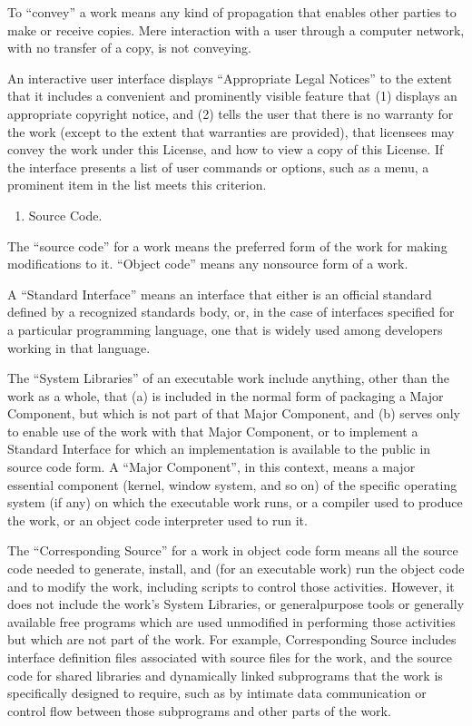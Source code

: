 \documentclass[letterpaper,10pt,english]{sphinxmanual}
\begin{document}
\sphinxAtStartPar
To “convey” a work means any kind of propagation that enables other parties to make or receive copies. Mere interaction with a user through a computer network, with no transfer of a copy, is not conveying.

\sphinxAtStartPar
An interactive user interface displays “Appropriate Legal Notices” to the extent that it includes a convenient and prominently visible feature that (1) displays an appropriate copyright notice, and (2) tells the user that there is no warranty for the work (except to the extent that warranties are provided), that licensees may convey the work under this License, and how to view a copy of this License. If the interface presents a list of user commands or options, such as a menu, a prominent item in the list meets this criterion.
\begin{enumerate}
%
\item {} 
\sphinxAtStartPar
Source Code.

\end{enumerate}

\sphinxAtStartPar
The “source code” for a work means the preferred form of the work for making modifications to it. “Object code” means any non\sphinxhyphen{}source form of a work.

\sphinxAtStartPar
A “Standard Interface” means an interface that either is an official standard defined by a recognized standards body, or, in the case of interfaces specified for a particular programming language, one that is widely used among developers working in that language.

\sphinxAtStartPar
The “System Libraries” of an executable work include anything, other than the work as a whole, that (a) is included in the normal form of packaging a Major Component, but which is not part of that Major Component, and (b) serves only to enable use of the work with that Major Component, or to implement a Standard Interface for which an implementation is available to the public in source code form. A “Major Component”, in this context, means a major essential component (kernel, window system, and so on) of the specific operating system (if any) on which the executable work runs, or a compiler used to produce the work, or an object code interpreter used to run it.

\sphinxAtStartPar
The “Corresponding Source” for a work in object code form means all the source code needed to generate, install, and (for an executable work) run the object code and to modify the work, including scripts to control those activities. However, it does not include the work’s System Libraries, or general\sphinxhyphen{}purpose tools or generally available free programs which are used unmodified in performing those activities but which are not part of the work. For example, Corresponding Source includes interface definition files associated with source files for the work, and the source code for shared libraries and dynamically linked subprograms that the work is specifically designed to require, such as by intimate data communication or control flow between those subprograms and other parts of the work.
\end{document}
